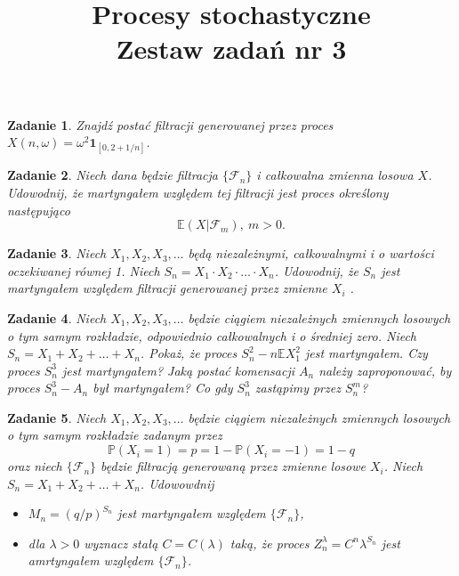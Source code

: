 \documentclass{mwart}
\title{Procesy stochastyczne\\ Zestaw zadań nr 3}
\newtheorem{zd}{Zadanie}
\begin{document}

\maketitle

\begin{zd}
Znajdź postać filtracji generowanej przez proces $X(n, \omega) = \omega^2\pmb{1}_{[0, 2+1/n]}$.
\end{zd}

\begin{zd}
Niech dana będzie filtracja $\{\mathcal{F}_n\}$ i całkowalna zmienna losowa $X$. Udowodnij, że martyngałem względem tej filtracji jest proces określony
następująco
\begin{displaymath}
\mathbb{E}\left(X|\mathcal{F}_m\right),\ m>0.
\end{displaymath}
\end{zd}

\begin{zd}
Niech $X_1, X_2, X_3, \dots$ będą niezależnymi, całkowalnymi i o wartości oczekiwanej równej 1. Niech $S_n = X_1\cdot X_2\cdot \dots \cdot X_n$. Udowodnij, że $S_n$ jest martyngałem względem filtracji generowanej przez zmienne $X_i$ .
\end{zd}

\begin{zd}
Niech $X_1, X_2, X_3, \dots$ będzie ciągiem niezależnych zmiennych losowych o tym samym rozkładzie, odpowiednio całkowalnych i o średniej zero. Niech $S_n = X_1+X_2+\dots + X_n$. Pokaż, że proces $S_n^2 - n\mathbb{E}X_1^2$  jest martyngałem. Czy proces $S_n^3$ jest martyngałem? Jaką postać komensacji $A_n$ należy zaproponować, by proces $S_n^3-A_n$ był martyngałem? Co gdy $S_n^3$ zastąpimy przez $S_n^m$?
\end{zd}

\begin{zd}
Niech $X_1, X_2, X_3, \dots$ będzie ciągiem niezależnych zmiennych losowych o tym samym rozkładzie zadanym przez
\begin{displaymath}
\mathbb{P}\left(X_i = 1\right) = p = 1-\mathbb{P}\left(X_i = -1\right) = 1-q
\end{displaymath}
oraz niech $\{\mathcal{F}_n\}$ będzie filtracją generowaną przez zmienne losowe $X_i$. Niech $S_n = X_1 + X_2 + \dots +X_n$. Udowowdnij
\begin{itemize}
\item $M_n = \left(q/p\right)^{S_n}$ jest martyngałem względem $\{\mathcal{F}_n\}$,
\item dla $\lambda >0 $ wyznacz stałą $C = C(\lambda)$ taką, że proces $Z_n^{\lambda} = C^n\lambda^{S_n}$ jest amrtyngałem względem $\{\mathcal{F}_n\}$.
\end{itemize}
\end{zd}
\end{document}
